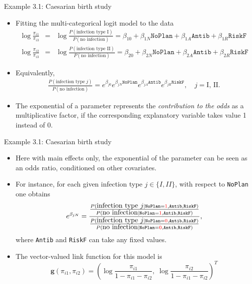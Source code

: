 \documentclass{beamer}
\begin{document}
\begin{frame}{Example 3.1: Caesarian birth study}
\begin{itemize}
\item
Fitting the multi-categorical logit model to the data {\footnotesize
\begin{eqnarray*}
\log\frac{\pi_{i1}}{\pi_{i3}}&=&\log\frac{P(\mbox{infection type I})}{P(\mbox{no infection})} 
=\beta_{10}+\beta_{1N}\texttt{NoPlan}+\beta_{1A}\texttt{Antib}+\beta_{1R}\texttt{RiskF} \\
\log\frac{\pi_{i2}}{\pi_{i3}}&=&\log\frac{P(\mbox{infection type II})}{P(\mbox{no infection})} 
=\beta_{20}+\beta_{2N}\texttt{NoPlan}+\beta_{2A}\texttt{Antib}+\beta_{2R}\texttt{RiskF}
\end{eqnarray*}}
\item
Equivalently,
\begin{eqnarray*}
\frac{P(\mbox{infection type}\; j)}{P(\mbox{no infection})} 
=e^{\beta_{j0}}e^{\beta_{jN}\texttt{NoPlan}}e^{\beta_{jA}\texttt{Antib}}e^{\beta_{jR}\texttt{RiskF}}, \quad
j=\mbox{I, II.} 
\end{eqnarray*}
\item
The exponential of a parameter represents the \emph{contribution to the odds} as a multiplicative factor, if the corresponding
explanatory variable takes value 1 instead of 0. 

\end{itemize}
\end{frame}

\begin{frame}{Example 3.1: Caesarian birth study}
\begin{itemize}
\item
Here with main effects only, the exponential of the parameter can be
seen as an odds ratio,  conditioned on other covariates.

\item
For instance, for each given infection type $j \in \{I, II\}$, with respect to \texttt{NoPlan} one obtains
\begin{eqnarray*}
e^{\beta_{jN}}=\frac{\frac{P(\mbox{infection type $j$}\mid \texttt{NoPlan} = \textcolor{red}{1}, \texttt{Antib}, 
\texttt{RiskF})}{P(\mbox{no infection} \mid \texttt{NoPlan} = \textcolor{red}{1}, \texttt{Antib}, \texttt{RiskF})}}{
\frac{P(\mbox{infection type $j$} \mid \texttt{NoPlan} = \textcolor{red}{0}, \texttt{Antib}, \texttt{RiskF})}{
P(\mbox{no infection} \mid \texttt{NoPlan} = \textcolor{red}{0}, \texttt{Antib}, \texttt{RiskF})}},\end{eqnarray*}
where \texttt{Antib} and \texttt{RiskF} can take any fixed values.
\item
The  vector-valued link function for this model is
$$\mathbf{g}(\pi_{i1},\pi_{i2})=\left(\log\frac{\pi_{i1}}{1-\pi_{i1}-\pi_{i2}}, \;
\log\frac{\pi_{i2}}{1-\pi_{i1}-\pi_{i2}}\right)^T$$
\end{itemize}
\end{frame}
\end{document}
